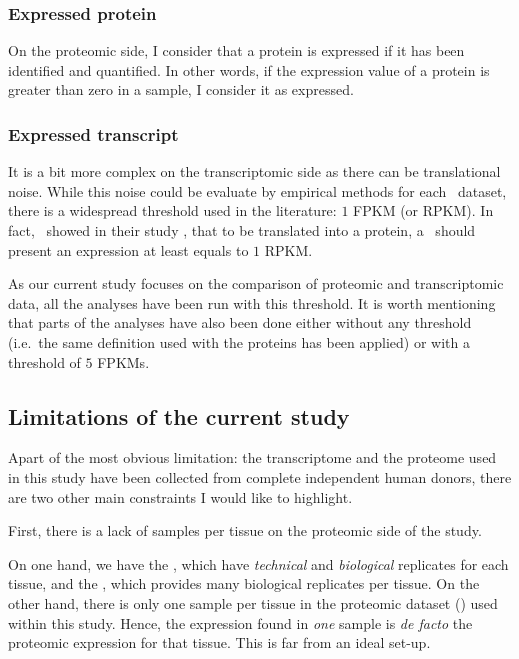\subsubsection{Expressed protein}
On the proteomic side, I consider that a protein is expressed if it has been
identified and quantified. In other words, if the expression value of a protein
is greater than zero in a sample, I consider it as expressed.

\subsubsection{Expressed transcript}\label{subsubsec:exprTrans}
It is a bit more complex on the transcriptomic side as there can be
translational noise. While this noise could be evaluate by empirical methods for
each \Rnaseq\ dataset, there is a widespread threshold used in the literature:
$1$ \gls{FPKM} (or \gls{RPKM}). In fact,~\cite{Hebenstreit:2011} showed in
their study , that to be translated into a protein, a \mRNA\ should
present an expression at least equals to $1$ \gls{RPKM}.

As our current study focuses on the comparison of proteomic and transcriptomic
data, all the analyses have been run with this threshold. It is worth mentioning
that parts of the analyses have also been done either without
any threshold (i.e.\ the same definition used with the proteins has been applied)
or with a threshold of $5$ \glspl{FPKM}.


\subsection{Limitations of the current study}
Apart of the most obvious limitation: the transcriptome and the proteome used in
this study have been collected from complete independent human donors, there are
two other main constraints I would like to highlight.

First, there is a lack of samples per tissue on the proteomic side of the study.

On one hand, we have the , which have \emph{technical}
and \emph{biological} replicates for each tissue, and the , which
provides many biological replicates per tissue. On the other hand, there is only
one sample per tissue in the proteomic dataset () used
within this study. Hence, the expression found in \emph{one} sample is
\textit{de facto} the proteomic expression for that tissue. This
is far from an ideal set-up.

